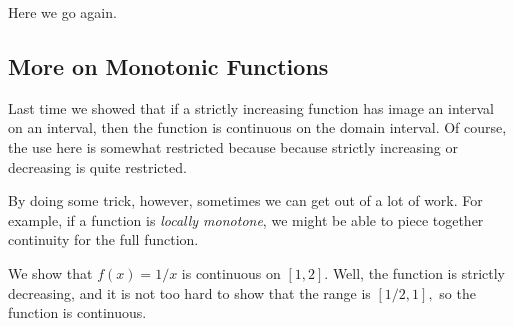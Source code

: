 \documentclass[../notes.tex]{subfiles}
\begin{document}















Here we go again.

\subsection{More on Monotonic Functions}
Last time we showed that if a strictly increasing function has image an interval on an interval, then the function is continuous on the domain interval. Of course, the use here is somewhat restricted because because strictly increasing or decreasing is quite restricted.

By doing some trick, however, sometimes we can get out of a lot of work. For example, if a function is \textit{locally monotone}, we might be able to piece together continuity for the full function.
\begin{example}
	We show that $f(x)=1/x$ is continuous on $[1,2].$ Well, the function is strictly decreasing, and it is not too hard to show that the range is $[1/2,1],$ so the function is continuous.
\end{example}
\end{document}
